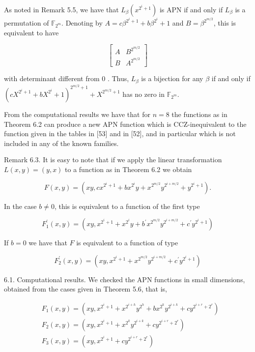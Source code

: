 \documentclass[10pt]{article}
\begin{document}
As noted in Remark 5.5, we have that $L_{\beta}\left(x^{2^{i}+1}\right)$ is APN if and only if $L_{\beta}$ is a permutation of $\mathbb{F}_{2^{m}}$. Denoting by $A=c \beta^{2^{i}+1}+b \beta^{2^{i}}+1$ and $B=\beta^{2^{m / 2}}$, this is equivalent to have

$$
\left[\begin{array}{ll}
A & B^{2^{m / 2}} \\
B & A^{2^{m / 2}}
\end{array}\right]
$$

with determinant different from 0 . Thus, $L_{\beta}$ is a bijection for any $\beta$ if and only if $\left(c X^{2^{i}+1}+b X^{2^{i}}+1\right)^{2^{m / 2}+1}+X^{2^{m / 2}+1}$ has no zero in $\mathbb{F}_{2^{m}}$.

From the computational results we have that for $n=8$ the functions as in Theorem 6.2 can produce a new APN function which is CCZ-inequivalent to the function given in the tables in [53] and in [52], and in particular which is not included in any of the known families.

Remark 6.3. It is easy to note that if we apply the linear transformation $L(x, y)=(y, x)$ to a function as in Theorem 6.2 we obtain

$$
F(x, y)=\left(x y, c x^{2^{i}+1}+b x^{2^{i}} y+x^{2^{m / 2}} y^{2^{i+m / 2}}+y^{2^{i}+1}\right) .
$$

In the case $b \neq 0$, this is equivalent to a function of the first type

$$
F_{1}^{\prime}(x, y)=\left(x y, x^{2^{i}+1}+x^{2^{i}} y+b^{\prime} x^{2^{m / 2}} y^{2^{i+m / 2}}+c^{\prime} y^{2^{i}+1}\right)
$$

If $b=0$ we have that $F$ is equivalent to a function of type

$$
F_{2}^{\prime}(x, y)=\left(x y, x^{2^{i}+1}+x^{2^{m / 2}} y^{2^{i+m / 2}}+c^{\prime} y^{2^{i}+1}\right)
$$

6.1. Computational results. We checked the APN functions in small dimensions, obtained from the cases given in Theorem 5.6, that is,

$$
\begin{aligned}
& F_{1}(x, y)=\left(x y, x^{2^{i}+1}+x^{2^{i+h}} y^{2^{h}}+b x^{2^{k}} y^{2^{i+k}}+c y^{2^{i+r}+2^{r}}\right) \\
& F_{2}(x, y)=\left(x y, x^{2^{i}+1}+x^{2^{k}} y^{2^{i+k}}+c y^{2^{i+r}+2^{r}}\right) \\
& F_{3}(x, y)=\left(x y, x^{2^{i}+1}+c y^{2^{i+r}+2^{r}}\right)
\end{aligned}
$$
\end{document}
